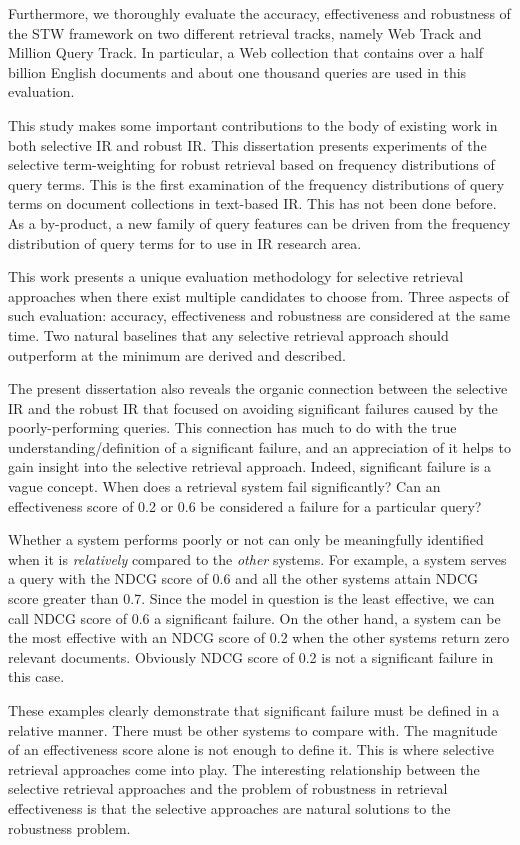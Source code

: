 Furthermore, we thoroughly evaluate the accuracy, effectiveness and robustness of the STW framework on two different retrieval tracks, namely Web Track and Million Query Track.
In particular, a Web collection that contains over a half billion English documents and about one thousand queries are used in this evaluation.

This study makes some important contributions to the body of existing work in both selective IR and robust IR. 
This dissertation presents experiments of the selective term-weighting for robust retrieval based on frequency distributions of query terms. 
This is the first examination of the frequency distributions of query terms on document collections in text-based IR. 
This has not been done before. 
As a by-product, a new family of query features can be driven from the frequency distribution of query terms for to use in IR research area.

This work presents a unique evaluation methodology for selective retrieval approaches when there exist multiple candidates to choose from.
Three aspects of such evaluation: accuracy, effectiveness and robustness are considered at the same time.
Two natural baselines that any selective retrieval approach should outperform at the minimum are derived and described.

The present dissertation also reveals the organic connection between the selective IR and the robust IR that focused on avoiding significant failures caused by the poorly-performing queries. 
This connection has much to do with the true understanding/definition of a significant failure, and an appreciation of it helps to gain insight into the selective retrieval approach.
Indeed, significant failure is a vague concept. 
When does a retrieval system fail significantly?
Can an effectiveness score of 0.2 or 0.6 be considered a failure for a particular query?

Whether a system performs poorly or not can only be meaningfully identified when it is \emph{relatively} compared to the \emph{other} systems.
For example, a system serves a query with the NDCG score of 0.6 and all the other systems attain NDCG score greater than 0.7. 
Since the model in question is the least effective, we can call NDCG score of 0.6 a significant failure.
On the other hand, a system can be the most effective with an NDCG score of 0.2 when the other systems return zero relevant documents.
Obviously NDCG score of 0.2 is not a significant failure in this case.

These examples clearly demonstrate that significant failure must be defined in a relative manner.
There must be other systems to compare with. 
The magnitude of an effectiveness score alone is not enough to define it. 
This is where selective retrieval approaches come into play.
The interesting relationship between the selective retrieval approaches and the problem of robustness in retrieval effectiveness is that the selective approaches are natural solutions to the robustness problem.


